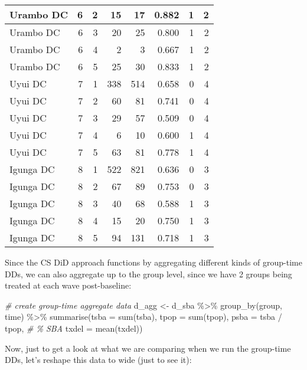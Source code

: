 \documentclass[
]{article}
\newenvironment{Shaded}{\begin{snugshade}}{\end{snugshade}}
\newcommand{\AttributeTok}[1]{\textcolor[rgb]{0.77,0.63,0.00}{#1}}
\newcommand{\CommentTok}[1]{\textcolor[rgb]{0.56,0.35,0.01}{\textit{#1}}}
\newcommand{\FunctionTok}[1]{\textcolor[rgb]{0.00,0.00,0.00}{#1}}
\newcommand{\NormalTok}[1]{#1}
\newcommand{\OtherTok}[1]{\textcolor[rgb]{0.56,0.35,0.01}{#1}}
\newcommand{\SpecialCharTok}[1]{\textcolor[rgb]{0.00,0.00,0.00}{#1}}
\begin{document}
\begin{table}
\begin{tabular}[t]{l|r|r|r|r|r|r|r}
\hline
Urambo DC & 6 & 2 & 15 & 17 & 0.882 & 1 & 2\\
\hline
Urambo DC & 6 & 3 & 20 & 25 & 0.800 & 1 & 2\\
\hline
Urambo DC & 6 & 4 & 2 & 3 & 0.667 & 1 & 2\\
\hline
Urambo DC & 6 & 5 & 25 & 30 & 0.833 & 1 & 2\\
\hline
Uyui DC & 7 & 1 & 338 & 514 & 0.658 & 0 & 4\\
\hline
Uyui DC & 7 & 2 & 60 & 81 & 0.741 & 0 & 4\\
\hline
Uyui DC & 7 & 3 & 29 & 57 & 0.509 & 0 & 4\\
\hline
Uyui DC & 7 & 4 & 6 & 10 & 0.600 & 1 & 4\\
\hline
Uyui DC & 7 & 5 & 63 & 81 & 0.778 & 1 & 4\\
\hline
Igunga DC & 8 & 1 & 522 & 821 & 0.636 & 0 & 3\\
\hline
Igunga DC & 8 & 2 & 67 & 89 & 0.753 & 0 & 3\\
\hline
Igunga DC & 8 & 3 & 40 & 68 & 0.588 & 1 & 3\\
\hline
Igunga DC & 8 & 4 & 15 & 20 & 0.750 & 1 & 3\\
\hline
Igunga DC & 8 & 5 & 94 & 131 & 0.718 & 1 & 3\\
\hline
\end{tabular}
\end{table}

Since the CS DiD approach functions by aggregating different kinds of
group-time DDs, we can also aggregate up to the group level, since we
have 2 groups being treated at each wave post-baseline:

\begin{Shaded}
\begin{Highlighting}[]
\CommentTok{\# create group{-}time aggregate data}
\NormalTok{d\_agg }\OtherTok{\textless{}{-}}\NormalTok{ d\_sba }\SpecialCharTok{\%\textgreater{}\%} \FunctionTok{group\_by}\NormalTok{(group, time) }\SpecialCharTok{\%\textgreater{}\%}
  \FunctionTok{summarise}\NormalTok{(}\AttributeTok{tsba =} \FunctionTok{sum}\NormalTok{(tsba),}
         \AttributeTok{tpop =} \FunctionTok{sum}\NormalTok{(tpop),}
         \AttributeTok{psba =}\NormalTok{ tsba }\SpecialCharTok{/}\NormalTok{ tpop, }\CommentTok{\# \% SBA}
         \AttributeTok{txdel =} \FunctionTok{mean}\NormalTok{(txdel))}
\end{Highlighting}
\end{Shaded}

Now, just to get a look at what we are comparing when we run the
group-time DDs, let's reshape this data to wide (just to see it):
\end{document}
